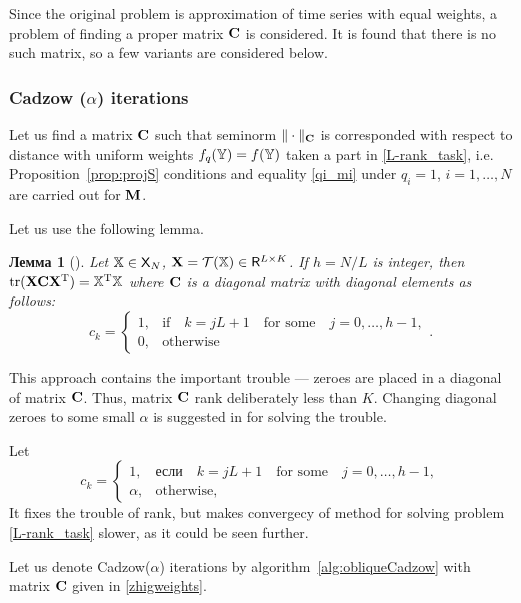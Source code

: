 \documentclass[12pt,a4paper,fleqn,leqno]{article}
\DeclareMathOperator{\tr}{tr}
\newtheorem{lemma}{Лемма}
\begin{document}
Since the original problem is approximation of time series with equal weights, a problem of finding a proper matrix $\mathbf{C}$ is considered.
It is found that there is no such matrix, so a few variants are considered below.

\subsubsection{Cadzow ($\alpha$) iterations}
\label{sec:cadzow_alpha}
Let us find a matrix $\mathbf{C}$ such that seminorm $\|\cdot\|_{\mathbf{C}}$ is corresponded with respect to distance with uniform weights $f_q(\mathbb{Y}) = f(\mathbb{Y})$ taken a part in \eqref{L-rank_task}, i.e. Proposition~\ref{prop:projS} conditions and equality \eqref{qi_mi} under $q_i = 1$, $i=1,\ldots,N$ are carried out for $\mathbf{M}$.

Let us use the following lemma.

\begin{lemma}[\cite{Gillard2014}]
\label{zhiglemma}
Let $\mathbb{X} \in \mathsf{X}_N$, $\mathbf{X} = \mathcal{T}(\mathbb{X}) \in \mathsf{R}^{L \times K}$. If $h = N/L$ is integer, then $\tr(\bfX \bfC \bfX^\rmT) = \tsX^\rmT \tsX$ where $\mathbf{C}$ is a diagonal matrix with diagonal elements as follows:
\begin{equation*}
c_k = \begin{cases}
1, & \text{if} \quad k = jL+1 \quad \text{for some} \quad j = 0, \ldots, h-1, \\
0, & \text{otherwise}
\end{cases}.
\end{equation*}
\end{lemma}

This approach contains the important trouble --- zeroes are placed in a diagonal of matrix $\mathbf{C}$. Thus, matrix $\mathbf{C}$ rank deliberately less than $K$. Changing diagonal zeroes to some small $\alpha$ is suggested in \cite{Gillard2014} for solving the trouble.

Let
\begin{equation}\label{zhigweights}
c_k = \begin{cases}
1, & \text{если} \quad k = jL+1 \quad \text{for some} \quad j = 0, \ldots, h-1, \\
\alpha, & \text{otherwise,}
\end{cases}
\end{equation}
It fixes the trouble of rank, but makes convergecy of method for solving problem \eqref{L-rank_task} slower, as it could be seen further.

Let us denote Cadzow($\alpha$) iterations by algorithm~\ref{alg:obliqueCadzow} with matrix $\mathbf{C}$  given in \eqref{zhigweights}.
\end{document}
